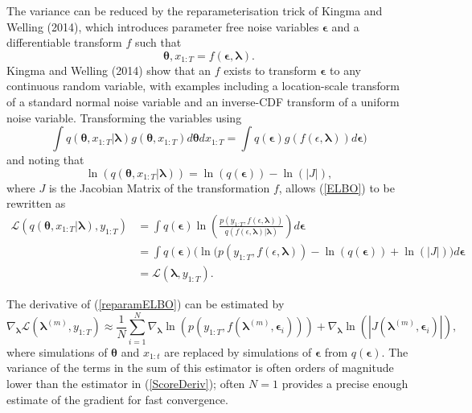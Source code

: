 \documentclass[12pt,a4paper]{article}%
\numberwithin{equation}{section}
\begin{document}
The variance can be reduced by the reparameterisation trick of Kingma and Welling (2014), which introduces parameter free noise variables $\boldsymbol{\epsilon}$ and a differentiable transform $f$ such that
\begin{equation}
\label{Reparam}
\boldsymbol{\theta}, x_{1:T} = f(\boldsymbol{\epsilon}, \boldsymbol{\lambda}).
\end{equation}
Kingma and Welling (2014) show that an $f$ exists to transform $\boldsymbol{\epsilon}$ to any continuous random variable, with examples including a location-scale transform of a standard normal noise variable and an inverse-CDF transform of a uniform noise variable. Transforming the variables using
\begin{equation}
\label{changevar}
\int q(\boldsymbol{\theta}, x_{1:T} | \boldsymbol{\lambda}) g(\boldsymbol{\theta}, x_{1:T})  d\boldsymbol{\theta}dx_{1:T} = \int q(\boldsymbol{\epsilon}) g ( f (\epsilon, \boldsymbol{\lambda})) d\boldsymbol{\epsilon})
\end{equation}
and noting that
\begin{equation}
\label{ReparamDist}
\ln(q(\boldsymbol{\theta}, x_{1:T} | \boldsymbol{\lambda})) = \ln(q(\boldsymbol{\epsilon})) - \ln(|J|),
\end{equation}
where $J$ is the Jacobian Matrix of the transformation $f$, allows (\ref{ELBO}) to be rewritten as
\begin{align}
\label{reparamELBO}
\mathcal{L}(q(\boldsymbol{\theta}, x_{1:T} | \boldsymbol{\lambda}), y_{1:T}) &=  \int  q(\boldsymbol{\epsilon}) \ln \left( \frac{p(y_{1:T}, f (\epsilon, \boldsymbol{\lambda}))}{q( f (\epsilon, \boldsymbol{\lambda}) | \boldsymbol{\lambda})} \right) d\boldsymbol{\epsilon} \nonumber \\
&= \int  q(\boldsymbol{\epsilon}) \big( \ln (p(y_{1:T}, f (\epsilon, \boldsymbol{\lambda})) - \ln(q(\boldsymbol{\epsilon})) + \ln(|J|) \big) d\boldsymbol{\epsilon} \nonumber \\
&= \mathcal{L}(\boldsymbol{\lambda}, y_{1:T}).
\end{align}

The derivative of (\ref{reparamELBO}) can be estimated by
\begin{equation}
\label{ReparamDeriv}
\nabla_{\boldsymbol{\lambda}}\mathcal{L}(\boldsymbol{\lambda}^{(m)}, y_{1:T}) \approx \frac{1}{N}\sum_{i=1}^{N} \nabla_{\boldsymbol{\lambda}} \ln (p(y_{1:T}, f(\boldsymbol{\lambda}^{(m)}, \boldsymbol{\epsilon}_i))) + \nabla_{\boldsymbol{\lambda}}\ln(|J(\boldsymbol{\lambda}^{(m)}, \boldsymbol{\epsilon}_i)|),
\end{equation}
where simulations of $\boldsymbol{\theta}$ and $x_{1:t}$ are replaced by simulations of $\boldsymbol{\epsilon}$ from $q(\boldsymbol{\epsilon})$. The variance of the terms in the sum of this estimator is often orders of magnitude lower than the estimator in (\ref{ScoreDeriv}); often $N = 1$ provides a precise enough estimate of the gradient for fast convergence.
\end{document}

